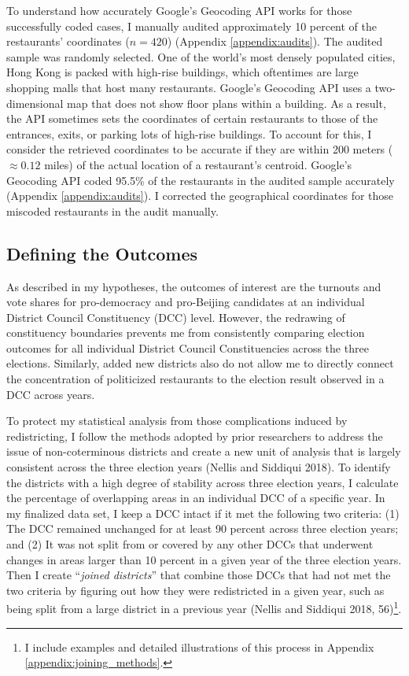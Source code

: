 \documentclass[letterpaper, 12pt]{article}
\begin{document}
To understand how accurately Google's Geocoding API works for those successfully coded cases, I manually audited approximately 10 percent of the restaurants' coordinates ($n = 420$) (Appendix \ref{appendix:audits}). The audited sample was randomly selected. One of the world's most densely populated cities, Hong Kong is packed with high-rise buildings, which oftentimes are large shopping malls that host many restaurants. Google's Geocoding API uses a two-dimensional map that does not show floor plans within a building. As a result, the API sometimes sets the coordinates of certain restaurants to those of the entrances, exits, or parking lots of high-rise buildings. To account for this, I consider the retrieved coordinates to be accurate if they are within 200 meters ($\approx 0.12$ miles) of the actual location of a restaurant's centroid. Google's Geocoding API coded 95.5\% of the restaurants in the audited sample accurately (Appendix \ref{appendix:audits}). I corrected the geographical coordinates for those miscoded restaurants in the audit manually.


\subsection{Defining the Outcomes}
As described in my hypotheses, the outcomes of interest are the turnouts and vote shares for pro-democracy and pro-Beijing candidates at an individual District Council Constituency (DCC) level. However, the redrawing of constituency boundaries prevents me from consistently comparing election outcomes for all individual District Council Constituencies across the three elections. Similarly, added new districts also do not allow me to directly connect the concentration of politicized restaurants to the election result observed in a DCC across years. 

To protect my statistical analysis from those complications induced by redistricting, I follow the methods adopted by prior researchers to address the issue of non-coterminous districts and create a new unit of analysis that is largely consistent across the three election years (Nellis and Siddiqui 2018). To identify the districts with a high degree of stability across three election years, I calculate the percentage of overlapping areas in an individual DCC of a specific year. In my finalized data set, I keep a DCC intact if it met the following two criteria: (1) The DCC remained unchanged for at least 90 percent across three election years; and (2) It was not split from or covered by any other DCCs that underwent changes in areas larger than 10 percent in a given year of the three election years. Then I create ``\textit{joined districts}'' that combine those DCCs that had not met the two criteria by figuring out how they were redistricted in a given year, such as being split from a large district in a previous year (Nellis and Siddiqui 2018, 56)\footnote{I include examples and detailed illustrations of this process in Appendix \ref{appendix:joining_methods}.}. 
\end{document}
